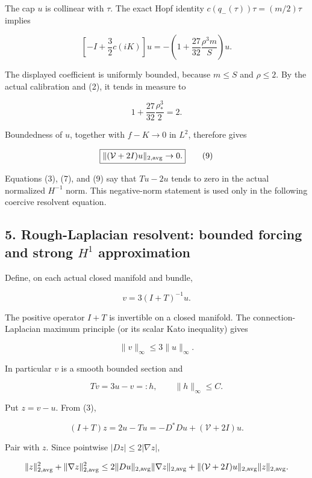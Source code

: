 \documentclass[11pt]{article}
\begin{document}
The cap \(u\) is collinear with \(\tau\). The exact Hopf identity
\(c(q_-(\tau))\tau=(m/2)\tau\) implies

\[
 \left[-I+\frac32c(iK)\right]u
 =-\left(1+\frac{27}{32}\frac{\rho^3m}{S}\right)u.
\tag{8}
\]

The displayed coefficient is uniformly bounded, because \(m\le S\) and
\(\rho\le2\). By the actual calibration and (2), it tends in measure to

\[
 1+\frac{27}{32}\frac{\rho_*^3}{2}=2.
\]

Boundedness of \(u\), together with \(f-K\to0\) in \(L^2\), therefore
gives

\[
 \boxed{\|(\mathcal V+2I)u\|_{2,\rm avg}\to0.}\tag{9}
\]

Equations (3), (7), and (9) say that \(Tu-2u\) tends to zero in the
actual normalized \(H^{-1}\) norm. This negative-norm statement is used
only in the following coercive resolvent equation.

\hypertarget{o10strength:rough-laplacian-resolvent-bounded-forcing-and-strong-h1-approximation}{%
\subsection{\texorpdfstring{5. Rough-Laplacian resolvent: bounded
forcing and strong \(H^1\)
approximation}{5. Rough-Laplacian resolvent: bounded forcing and strong H\^{}1 approximation}}\label{o10strength:rough-laplacian-resolvent-bounded-forcing-and-strong-h1-approximation}}

Define, on each actual closed manifold and bundle,

\[
 v=3(I+T)^{-1}u.
\tag{10}
\]

The positive operator \(I+T\) is invertible on a closed manifold. The
connection-Laplacian maximum principle (or its scalar Kato inequality)
gives

\[
 \|v\|_\infty\le3\|u\|_\infty.
\tag{11}
\]

In particular \(v\) is a smooth bounded section and

\[
 Tv=3u-v=:h,\qquad \|h\|_\infty\le C.
\tag{12}
\]

Put \(z=v-u\). From (3),

\[
 (I+T)z=2u-Tu=-D^*Du+(\mathcal V+2I)u.
\]

Pair with \(z\). Since pointwise \(|Dz|\le2|\nabla z|\),

\[
 \|z\|_{2,\rm avg}^2+\|\nabla z\|_{2,\rm avg}^2
 \le2\|Du\|_{2,\rm avg}\|\nabla z\|_{2,\rm avg}
 +\|(\mathcal V+2I)u\|_{2,\rm avg}\|z\|_{2,\rm avg}.
\]
\end{document}
